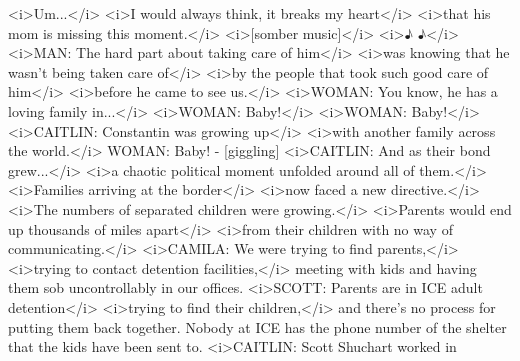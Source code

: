 \begin{itemize}
\begin{itemize}
    \textless{}i\textgreater{}Um...\textless{}/i\textgreater{}
    \textless{}i\textgreater{}I would always think, it breaks my
    heart\textless{}/i\textgreater{} \textless{}i\textgreater{}that his
    mom is missing this moment.\textless{}/i\textgreater{}
    \textless{}i\textgreater{}{[}somber
    music{]}\textless{}/i\textgreater{} \textless{}i\textgreater{}♪
    ♪\textless{}/i\textgreater{} \textless{}i\textgreater{}MAN: The hard
    part about taking care of him\textless{}/i\textgreater{}
    \textless{}i\textgreater{}was knowing that he wasn't being taken
    care of\textless{}/i\textgreater{} \textless{}i\textgreater{}by the
    people that took such good care of him\textless{}/i\textgreater{}
    \textless{}i\textgreater{}before he came to see
    us.\textless{}/i\textgreater{} \textless{}i\textgreater{}WOMAN: You
    know, he has a loving family in...\textless{}/i\textgreater{}
    \textless{}i\textgreater{}WOMAN: Baby!\textless{}/i\textgreater{}
    \textless{}i\textgreater{}WOMAN: Baby!\textless{}/i\textgreater{}
    \textless{}i\textgreater{}CAITLIN: Constantin was growing
    up\textless{}/i\textgreater{} \textless{}i\textgreater{}with another
    family across the world.\textless{}/i\textgreater{} WOMAN: Baby! -
    {[}giggling{]} \textless{}i\textgreater{}CAITLIN: And as their bond
    grew...\textless{}/i\textgreater{} \textless{}i\textgreater{}a
    chaotic political moment unfolded around all of
    them.\textless{}/i\textgreater{} \textless{}i\textgreater{}Families
    arriving at the border\textless{}/i\textgreater{}
    \textless{}i\textgreater{}now faced a new
    directive.\textless{}/i\textgreater{} \textless{}i\textgreater{}The
    numbers of separated children were
    growing.\textless{}/i\textgreater{}
    \textless{}i\textgreater{}Parents would end up thousands of miles
    apart\textless{}/i\textgreater{} \textless{}i\textgreater{}from
    their children with no way of
    communicating.\textless{}/i\textgreater{}
    \textless{}i\textgreater{}CAMILA: We were trying to find
    parents,\textless{}/i\textgreater{} \textless{}i\textgreater{}trying
    to contact detention facilities,\textless{}/i\textgreater{} meeting
    with kids and having them sob uncontrollably in our offices.
    \textless{}i\textgreater{}SCOTT: Parents are in ICE adult
    detention\textless{}/i\textgreater{}
    \textless{}i\textgreater{}trying to find their
    children,\textless{}/i\textgreater{} and there's no process for
    putting them back together. Nobody at ICE has the phone number of
    the shelter that the kids have been sent to.
    \textless{}i\textgreater{}CAITLIN: Scott Shuchart worked in

\end{itemize}
\end{itemize}
